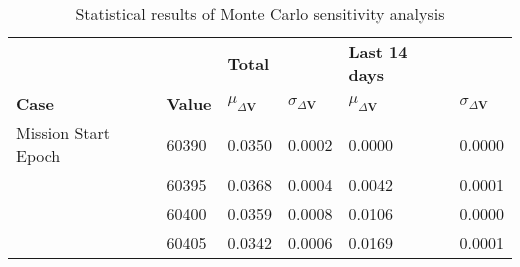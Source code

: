 \begin{table}[h!]
\centering
\begin{tabular}{llllll}
 &  & \cellcolor[HTML]{EFEFEF}\textbf{Total} &  & \cellcolor[HTML]{EFEFEF}\textbf{Last 14 days} &  \\
\rowcolor[HTML]{EFEFEF} 
\textbf{Case} & \textbf{Value} & \textbf{$\mu_{\Delta \boldsymbol{V}}$} & \textbf{$\sigma_{\Delta \boldsymbol{V}}$} & \textbf{$\mu_{\Delta \boldsymbol{V}}$} & \textbf{$\sigma_{\Delta \boldsymbol{V}}$} \\ 
Mission Start Epoch & 60390 & 0.0350 & 0.0002 & 0.0000 & 0.0000 \\ 
 & 60395 & 0.0368 & 0.0004 & 0.0042 & 0.0001 \\ 
 & 60400 & 0.0359 & 0.0008 & 0.0106 & 0.0000 \\ 
 & 60405 & 0.0342 & 0.0006 & 0.0169 & 0.0001 \\ 
\end{tabular}
\caption{Statistical results of Monte Carlo sensitivity analysis}
\label{tab:SensitivityAnalysis}
\end{table}